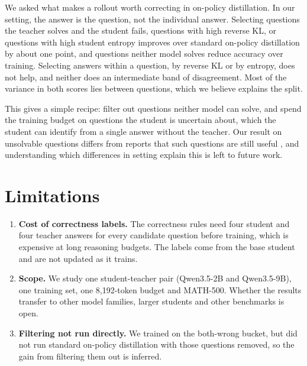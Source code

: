 \documentclass[11pt]{article}
\begin{document}
We asked what makes a rollout worth correcting in on-policy distillation.
In our setting, the answer is the question, not the individual answer.
Selecting questions the teacher solves and the student fails, questions with high reverse KL, or questions with high student entropy improves over standard on-policy distillation by about one point, and questions neither model solves reduce accuracy over training.
Selecting answers within a question, by reverse KL or by entropy, does not help, and neither does an intermediate band of disagreement.
Most of the variance in both scores lies between questions, which we believe explains the split.

This gives a simple recipe: filter out questions neither model can solve, and spend the training budget on questions the student is uncertain about, which the student can identify from a single answer without the teacher.
Our result on unsolvable questions differs from reports that such questions are still useful \citep{hou2026whatmatters,li2026everycoin}, and understanding which differences in setting explain this is left to future work.

\section*{Limitations}

\begin{enumerate}
\item \textbf{Cost of correctness labels.} The correctness rules need four student and four teacher answers for every candidate question before training, which is expensive at long reasoning budgets. The labels come from the base student and are not updated as it trains.
\item \textbf{Scope.} We study one student-teacher pair (Qwen3.5-2B and Qwen3.5-9B), one training set, one 8,192-token budget and MATH-500. Whether the results transfer to other model families, larger students and other benchmarks is open.
\item \textbf{Filtering not run directly.} We trained on the both-wrong bucket, but did not run standard on-policy distillation with those questions removed, so the gain from filtering them out is inferred.
\end{enumerate}


\end{document}
